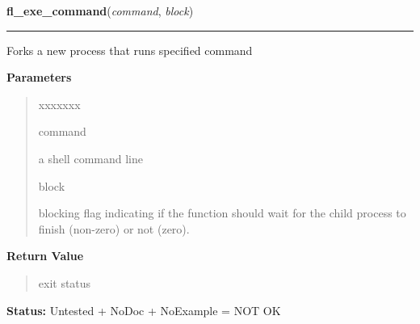 \hspace{.8\funcindent}\begin{boxedminipage}{\funcwidth}

    \raggedright \textbf{fl\_exe\_command}(\textit{command}, \textit{block})

    \vspace{-1.5ex}

    \rule{\textwidth}{0.5\fboxrule}
\setlength{\parskip}{2ex}
    Forks a new process that runs specified command

\setlength{\parskip}{1ex}
      \textbf{Parameters}
      \vspace{-1ex}

      \begin{quote}
        \begin{Ventry}{xxxxxxx}

          \item[command]

          a shell command line

          \item[block]

          blocking flag indicating if the function should wait for the 
          child process to finish (non-zero) or not (zero).

        \end{Ventry}

      \end{quote}

      \textbf{Return Value}
    \vspace{-1ex}

      \begin{quote}
      exit status

      \end{quote}

\textbf{Status:} Untested + NoDoc + NoExample = NOT OK



    \end{boxedminipage}

    \label{xformslib:library:fl_exe_command}

    \vspace{0.5ex}

